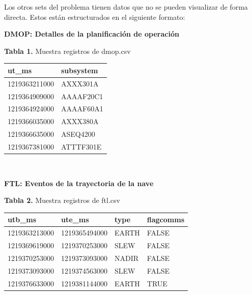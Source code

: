 \documentclass[../Main.tex]{subfiles}
\begin{document}
Los otros sets del problema tienen datos que no se pueden visualizar de forma directa. Estos están estructurados en el siguiente formato:
\newline \par

\textbf{DMOP: Detalles de la planificación de operación}
\begin{center}
\textbf{Tabla 1.} Muestra registros de dmop.csv\\
\begin{tabular}{|l|l|}\hline
ut\_ms        & subsystem \\ \hline
1219363211000 & AXXX301A  \\
1219364909000 & AAAAF20C1 \\
1219364924000 & AAAAF60A1 \\
1219366035000 & AXXX380A  \\
1219366635000 & ASEQ4200  \\
1219367381000 & ATTTF301E \\ \hline
\end{tabular}
\\[20pt]
\end{center}

\textbf{FTL: Eventos de la trayectoria de la nave}
\begin{center}
\textbf{Tabla 2.} Muestra registros de ftl.csv\\
\begin{tabular}{|l|l|l|l|}\hline
utb\_ms       & ute\_ms       & type  & flagcomms \\ \hline
1219363213000 & 1219365494000 & EARTH & FALSE     \\
1219369619000 & 1219370253000 & SLEW  & FALSE     \\
1219370253000 & 1219373093000 & NADIR & FALSE     \\
1219373093000 & 1219374563000 & SLEW  & FALSE     \\
1219376633000 & 1219381144000 & EARTH & TRUE      \\ \hline
\end{tabular}
\\[20pt]
\end{center}
\end{document}
